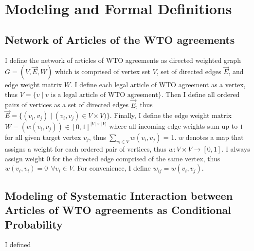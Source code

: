\section{Modeling and Formal Definitions}
\subsection{Network of Articles of the WTO agreements \label{subsec:def}}

I define the network of articles of WTO agreements as directed weighted graph $G=(V, \vec{E}, W)$ which is comprised of 
vertex set $V$, set of directed edges $\vec{E}$, and edge weight matrix $W$. I define each legal article of WTO agreement as a vertex, thus
$V=\{v \mid v\text{ is a legal article of WTO agreement\}}$. Then I define all ordered pairs of vertices as a set of directed edges $\vec{E}$, thus
$\vec{E} = \{(v_i, v_j) \mid (v_i, v_j)\in V \times V)\}$. 
Finally, I define the edge weight matrix $W=(w(v_i, v_j)) \in [0,1]^{|V| \times |V|}$ where all incoming edge weights sum up to $1$ for all given target vertex $v_j$, thus
$\sum_{v_i\in V}{w(v_i, v_j)}$ = 1. $w$ denotes a map that assigns a weight for each ordered pair of vertices, thus $w : V \times V \to [0,1]$. 
I always assign weight $0$ for the directed edge comprised of the same vertex, thus  $w(v_i, v_i) = 0 \:\: \forall{v_i \in V}$.
For convenience, I define $w_{ij} = w(v_i, v_j)$.


\subsection{Modeling of Systematic Interaction between Articles of WTO agreements as Conditional Probability}
I defined 



